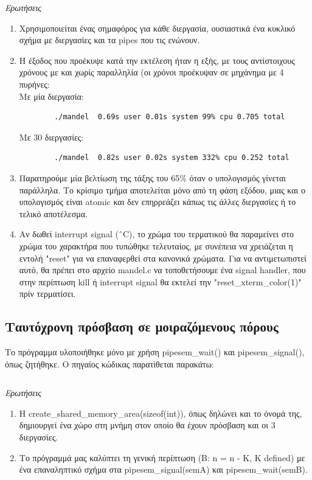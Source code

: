 \documentclass[a4paper,10pt]{article} \usepackage{anysize}
\begin{document}
\emph{Ερωτήσεις}
\begin{enumerate}
	\item Χρησιμοποιείται ένας σημαφόρος για κάθε διεργασία, ουσιαστικά ένα
		κυκλικό σχήμα με διεργασίες και τα pipes που τις ενώνουν.
	\item Η έξοδος που προέκυψε κατά την εκτέλεση ήταν η εξής, με τους
		αντίστοιχους χρόνους με και χωρίς παραλληλία (οι χρόνοι προέκυψαν σε
		μηχάνημα με 4 πυρήνες:\\
		Mε μία διεργασία:\\
		\begin{verbatim}
		./mandel  0.69s user 0.01s system 99% cpu 0.705 total
		\end{verbatim}
		Με 30 διεργασίες:\\
		\begin{verbatim}
		./mandel  0.82s user 0.02s system 332% cpu 0.252 total
		\end{verbatim}
	\item Παρατηρούμε μία βελτίωση της τάξης του 65\% όταν ο υπολογισμός
		γίνεται παράλληλα. Το κρίσιμο τμήμα αποτελείται μόνο από τη φάση
		εξόδου, μιας και ο υπολογισμός είναι atomic και δεν επηρρεάζει κάπως
		τις άλλες διεργασίες ή το τελικό αποτέλεσμα.
	\item Αν δωθεί interrupt signal (\^\ C), το χρώμα του τερματικού θα
		παραμείνει στο χρώμα του χαρακτήρα που τυπώθηκε τελευταίος, με
		συνέπεια να χρειάζεται η εντολή "reset" για να επαναφερθεί στα
		κανονικά χρώματα. Για να αντιμετωπιστεί αυτό, θα πρέπει στο αρχείο
		mandel.c να τοποθετήσουμε ένα signal handler, που στην περίπτωση kill
		ή interrupt signal θα εκτελεί την "reset\_xterm\_color(1)" πρίν
		τερματίσει.
\end{enumerate}

\pagebreak

\subsection{Ταυτόχρονη πρόσβαση σε μοιραζόμενους πόρους} 
Το πρόγραμμα υλοποιήθηκε μόνο με χρήση pipesem\_wait() και pipesem\_signal(),
όπως ζητήθηκε.
\noindent Ο πηγαίος κώδικας παρατίθεται παρακάτω:

\inputminted[linenos,fontsize=\footnotesize,frame=leftline]{c}{files/procs-shm.c}
\newpage

\emph{Ερωτήσεις}
\begin{enumerate}
	\item Η create\_shared\_memory\_area(sizeof(int)), όπως δηλώνει και το
		όνομά της, δημιουργεί ένα χώρο στη μνήμη στον οποίο θα έχουν πρόσβαση
		και οι 3 διεργασίες.
	\item Το πρόγραμμά μας καλύπτει τη γενική περίπτωση (Β: n = n - K,  K
		defined) με ένα επαναληπτικό σχήμα στα pipesem\_signal(semA) και
		pipesem\_wait(semB).
\end{enumerate}
\end{document}
